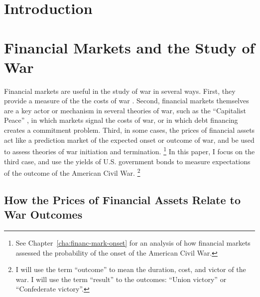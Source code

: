 

\section{Introduction}
\label{sec:introduction}



\section{Financial Markets and the Study of War}
\label{sec:barg-theory-war}

Financial markets are useful in the study of war in several ways.
First, they provide a measure of the the costs of war \parencites{SchneiderTroeger2006}{GuidolinLaFerrara2010}.
Second, financial markets themselves are a key actor or mechanism in several theories of war, such as the ``Capitalist Peace'' \parencites{Gartzke2007}{DafoeKelsey2014a}, in which markets signal the costs of war, or \textcite{Slantchev2012a} in which debt financing creates a commitment problem.
Third, in some cases, the prices of financial assets act like a prediction market of the expected onset or outcome of war, and be used to assess theories of war initiation and termination.%
\footnote{See Chapter~\ref{cha:financ-mark-onset} for an analysis of how financial markets assessed the probability of the onset of the American Civil War.}
In this paper, I focus on the third case, and use the yields of U.S. government bonds to measure expectations of the outcome of the American Civil War.%
\footnote{I will use the term ``outcome'' to mean the duration, cost, and victor of the war. I will use the term ``result'' to the outcomes: ``Union victory'' or ``Confederate victory''.}


\subsection{How the Prices of Financial Assets Relate to War Outcomes}
\label{sec:how-prices-financial}

